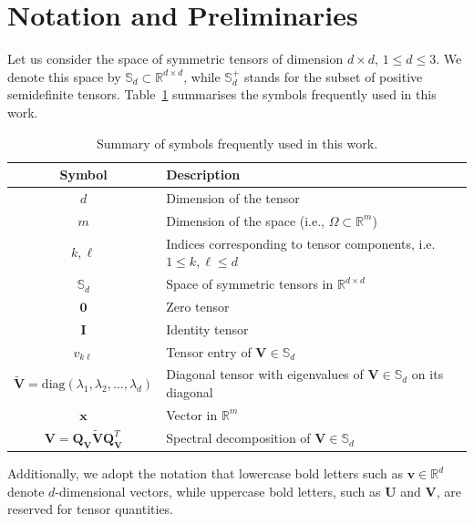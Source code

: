 \documentclass[final,12pt]{amsart}
\theoremstyle{plain}
\theoremstyle{definition}
\newcommand\bV{\mathbf{V}}
\begin{document}
\section{Notation and Preliminaries}
\label{sec:pre}

Let us consider the space of symmetric tensors of dimension $d \times d$, $1 \leq d \leq 3$.
We denote this space by $\mathbb{S}_d \subset \mathbb{R}^{d \times d}$, while $\mathbb{S}_d^+$ stands for the subset of positive semidefinite tensors.
Table~\ref{tab:notation} summarises the symbols frequently used in this work.

\begin{table}[h!]
	\centering
	\caption{Summary of symbols frequently used in this work.}
	\label{tab:notation}
	\begin{tabular}{|c|l|}
			\hline
			\textbf{Symbol} & \textbf{Description} \\ \hline
			$d$             & Dimension of the tensor \\ 
			$m$             & Dimension of the space (i.e., $\Omega\subset\mathbb{R}^m$) \\ 
			$k,\ell$        & Indices corresponding to tensor components, i.e. $1 \leq k,\ell \leq d$ \\ 
			$\mathbb{S}_d$  & Space of symmetric tensors in $\mathbb{R}^{d \times d}$ \\ 
			$\mathbf{0}$    & Zero tensor \\ 
			$\mathbf{I}$    & Identity tensor  \\ 
			$v_{k\ell}$     & Tensor entry of $\mathbf{V}\in \mathbb{S}_d $ \\
			$\tilde{\mathbf{V}}=\mathrm{diag}(\lambda_{1}, \lambda_{2},\ldots,\lambda_{d})$ & Diagonal tensor with eigenvalues of $\mathbf{V}\in \mathbb{S}_d$ on its diagonal \\ 
			$\mathbf{x}$    & Vector in $\mathbb{R}^{m}$ \\ 
			$\mathbf{V} =\mathbf{Q}_{\bV}\tilde{\mathbf{V}}\mathbf{Q}^{T}_{\bV}$ & Spectral decomposition of $\mathbf{V} \in \mathbb{S}_d$  
		\\ \hline
		\end{tabular}
\end{table}

Additionally, we adopt the notation that lowercase bold letters such as $\mathbf{v}\in \mathbb{R}^{d}$ denote $d$-dimensional vectors, while uppercase bold letters, such as $\mathbf{U}$ and $\mathbf{V}$, are reserved for tensor quantities.
\end{document}
